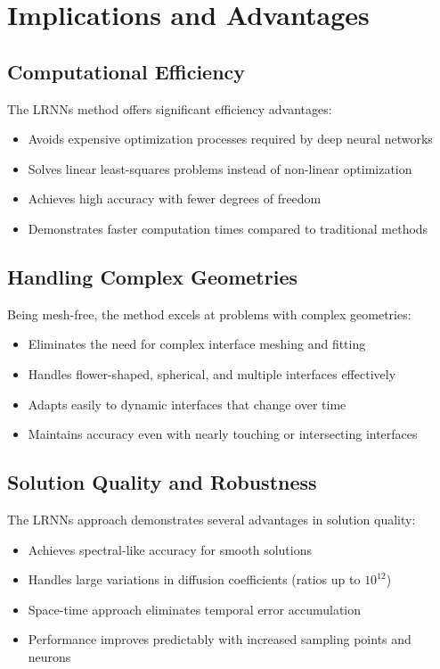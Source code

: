 \documentclass[11pt]{article}
\begin{document}
\section{Implications and Advantages}

\subsection{Computational Efficiency}
The LRNNs method offers significant efficiency advantages:
\begin{itemize}
    \item Avoids expensive optimization processes required by deep neural networks
    \item Solves linear least-squares problems instead of non-linear optimization
    \item Achieves high accuracy with fewer degrees of freedom
    \item Demonstrates faster computation times compared to traditional methods
\end{itemize}

\subsection{Handling Complex Geometries}
Being mesh-free, the method excels at problems with complex geometries:
\begin{itemize}
    \item Eliminates the need for complex interface meshing and fitting
    \item Handles flower-shaped, spherical, and multiple interfaces effectively
    \item Adapts easily to dynamic interfaces that change over time
    \item Maintains accuracy even with nearly touching or intersecting interfaces
\end{itemize}

\subsection{Solution Quality and Robustness}
The LRNNs approach demonstrates several advantages in solution quality:
\begin{itemize}
    \item Achieves spectral-like accuracy for smooth solutions
    \item Handles large variations in diffusion coefficients (ratios up to $10^{12}$)
    \item Space-time approach eliminates temporal error accumulation
    \item Performance improves predictably with increased sampling points and neurons
\end{itemize}
\end{document}
